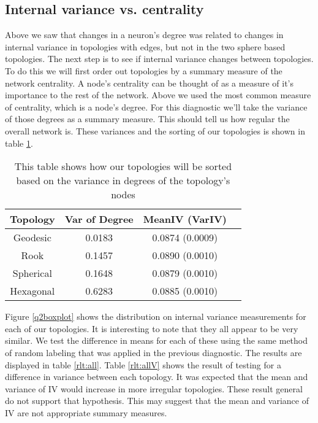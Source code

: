 \begin{table}[hbt]
\end{table}

\subsection{Internal variance vs. centrality}
Above we saw that changes in a neuron's degree was related to changes in
internal variance in topologies with edges, but not in the two sphere based
topologies. The next step is to see if internal variance changes between
topologies.  To do this we will first order out topologies by a summary
measure of the network centrality.  A node's centrality can be thought of as a
measure of it's importance to the rest of the network. Above we used the most
common measure of centrality, which is a node's degree.  For this diagnostic
we'll take the variance of those degrees as a summary measure.  This should
tell us how regular the overall network is.  These variances and the sorting
of our topologies is shown in table \ref{vardeg}.

\begin{table}[hbt]
\centering
\caption{This table shows how our topologies will be sorted based on the
variance in degrees of the topology's nodes}
\label{vardeg}
\begin{tabular}{|c|c|c|c|}
\hline
Topology & Var of Degree & MeanIV (VarIV)\\
\hline
Geodesic & 0.0183 & 0.0874 (0.0009)\\
Rook & 0.1457 & 0.0890 (0.0010)\\
Spherical & 0.1648 & 0.0879 (0.0010)\\
Hexagonal & 0.6283 & 0.0885 (0.0010)\\
\hline
\end{tabular}
\end{table}

Figure \ref{q2boxplot} shows the distribution on internal variance
measurements for each of our topologies.  It is interesting to note that
they all appear to be very similar. We test the difference in means for
each of these using the same method of random labeling that was applied in the
previous diagnostic. The results are displayed in table \ref{rlt:all}. Table
\ref{rlt:allV} shows the result of testing for a difference in variance
between each topology.  It was expected that the mean and variance of IV would
increase in more irregular topologies.  These result general do not support
that hypothesis. This may suggest that the mean and variance of IV are not
appropriate summary measures.


